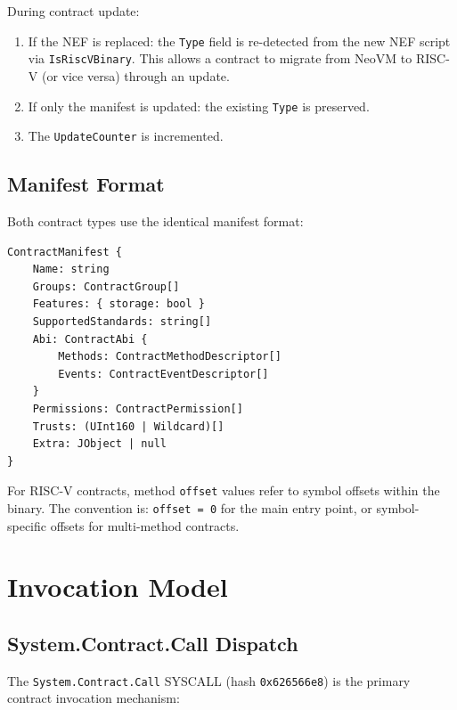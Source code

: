 \documentclass[11pt,a4paper]{article}
\begin{document}
During contract update:

\begin{enumerate}[noitemsep]
    \item If the NEF is replaced: the \texttt{Type} field is re-detected from
          the new NEF script via \texttt{IsRiscVBinary}. This allows a
          contract to migrate from NeoVM to RISC-V (or vice versa) through
          an update.
    \item If only the manifest is updated: the existing \texttt{Type} is
          preserved.
    \item The \texttt{UpdateCounter} is incremented.
\end{enumerate}

\subsection{Manifest Format}

Both contract types use the identical manifest format:

\begin{lstlisting}[caption={Contract manifest structure}]
ContractManifest {
    Name: string
    Groups: ContractGroup[]
    Features: { storage: bool }
    SupportedStandards: string[]
    Abi: ContractAbi {
        Methods: ContractMethodDescriptor[]
        Events: ContractEventDescriptor[]
    }
    Permissions: ContractPermission[]
    Trusts: (UInt160 | Wildcard)[]
    Extra: JObject | null
}
\end{lstlisting}

For RISC-V contracts, method \texttt{offset} values refer to symbol offsets
within the binary. The convention is: \texttt{offset = 0} for the main
entry point, or symbol-specific offsets for multi-method contracts.

\section{Invocation Model}
\label{sec:invocation}

\subsection{System.Contract.Call Dispatch}

The \texttt{System.Contract.Call} SYSCALL (hash \texttt{0x626566e8}) is the
primary contract invocation mechanism:
\end{document}
